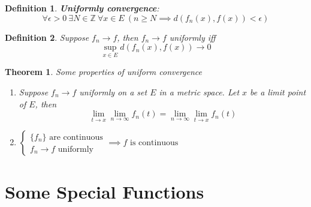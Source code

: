 \documentclass[aps,pra,onecolumn,notitlepage,superscriptaddress]{revtex4-1}
\newcommand{\Z}{\mathbb{Z}}
\newtheorem{theo}{Theorem}
\newtheorem{defi}{Definition}
\begin{document}
    \begin{defi}
        \textbf{Uniformly convergence}:
        \begin{equation}
            \forall \epsilon > 0 \ \exists N \in \Z \ \forall x \in E \ ( n \geq N \implies  d(f_n(x), f(x)) < \epsilon)
        \end{equation}
    \end{defi}

    \begin{defi}
        Suppose $f_n \to f$, then $f_n \to f$ uniformly iff
        \begin{equation}
            \sup_{x \in E} d(f_n(x), f(x)) \to 0
        \end{equation}
    \end{defi}

    \begin{theo}
        Some properties of uniform convergence
        \begin{enumerate}
            \item Suppose $f_n \to f$ uniformly on a set $E$ in a metric space. Let $x$ be a limit point of $E$, then
            \begin{equation}
                \lim_{t \to x}\lim_{n \to \infty} f_n(t) = \lim_{n \to \infty}\lim_{t \to x} f_n(t)
            \end{equation}

            \item $
            \begin{cases}
                \{f_n\} \text{ are continuous} \\
                f_n \to f \text{ uniformly}
            \end{cases}
            \implies f \text{ is continuous}
            $
        \end{enumerate}
        
    \end{theo}

    \section{Some Special Functions}
\end{document}
